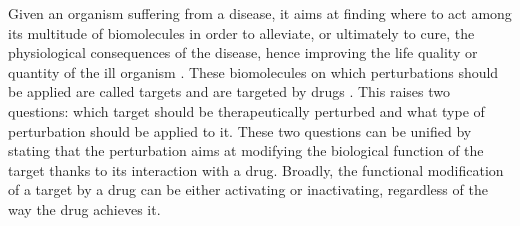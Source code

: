 \documentclass[oneside,a4paper,onecolumn,notitlepage]{article}
\begin{document}
Given an organism suffering from a disease, it aims at finding where to act among its multitude of biomolecules in order to alleviate, or ultimately to cure, the physiological consequences of the disease, hence improving the life quality or quantity of the ill organism \cite{knowles2003target}. These biomolecules on which perturbations should be applied are called targets and are targeted by drugs \cite{imming2006drugs}. This raises two questions: which target should be therapeutically perturbed and what type of perturbation should be applied to it. These two questions can be unified by stating that the perturbation aims at modifying the biological function of the target thanks to its interaction with a drug. Broadly, the functional modification of a target by a drug can be either activating or inactivating, regardless of the way the drug achieves it.
\end{document}
